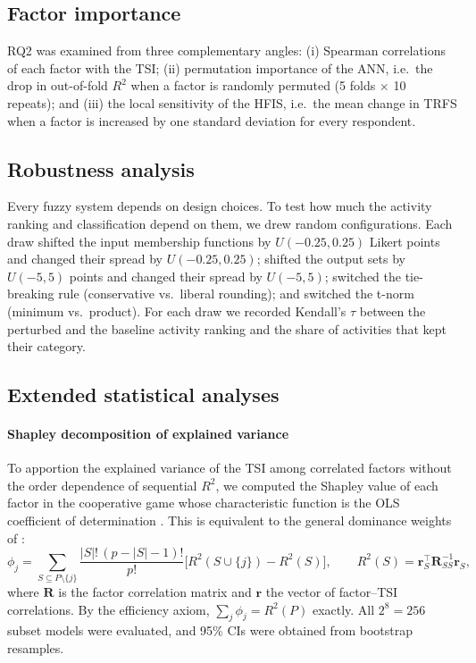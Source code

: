 \documentclass[preprint,12pt,authoryear]{elsarticle}
\theoremstyle{remark}
\begin{document}
\subsection{Factor importance}
RQ2 was examined from three complementary angles: (i) Spearman correlations of each factor with the TSI; (ii) permutation importance of the ANN, i.e.\ the drop in out-of-fold $R^2$ when a factor is randomly permuted (5 folds $\times$ 10 repeats); and (iii) the local sensitivity of the HFIS, i.e.\ the mean change in TRFS when a factor is increased by one standard deviation for every respondent.

\subsection{Robustness analysis}
Every fuzzy system depends on design choices. To test how much the activity ranking and classification depend on them, we drew \RobDraws{} random configurations. Each draw shifted the input membership functions by $U(-0.25,0.25)$ Likert points and changed their spread by $U(-0.25,0.25)$; shifted the output sets by $U(-5,5)$ points and changed their spread by $U(-5,5)$; switched the tie-breaking rule (conservative vs.\ liberal rounding); and switched the t-norm (minimum vs.\ product). For each draw we recorded Kendall's $\tau$ between the perturbed and the baseline activity ranking and the share of activities that kept their category.

\subsection{Extended statistical analyses}
\label{sec:extended-methods}
\paragraph{Shapley decomposition of explained variance} To apportion the explained variance of the TSI among correlated factors without the order dependence of sequential $R^2$, we computed the Shapley value of each factor in the cooperative game whose characteristic function is the OLS coefficient of determination \citep{lipovetsky2001}. This is equivalent to the general dominance weights of \citet{budescu1993}:
\begin{equation}
\phi_j=\sum_{S\subseteq P\setminus\{j\}}\frac{|S|!\,(p-|S|-1)!}{p!}\Big[R^2(S\cup\{j\})-R^2(S)\Big],\qquad R^2(S)=\mathbf{r}_S^{\top}\mathbf{R}_{SS}^{-1}\mathbf{r}_S,
\label{eq:shapley}
\end{equation}
where $\mathbf{R}$ is the factor correlation matrix and $\mathbf{r}$ the vector of factor--TSI correlations. By the efficiency axiom, $\sum_j\phi_j=R^2(P)$ exactly. All $2^8=256$ subset models were evaluated, and 95\% CIs were obtained from \ShapB{} bootstrap resamples.
\end{document}
